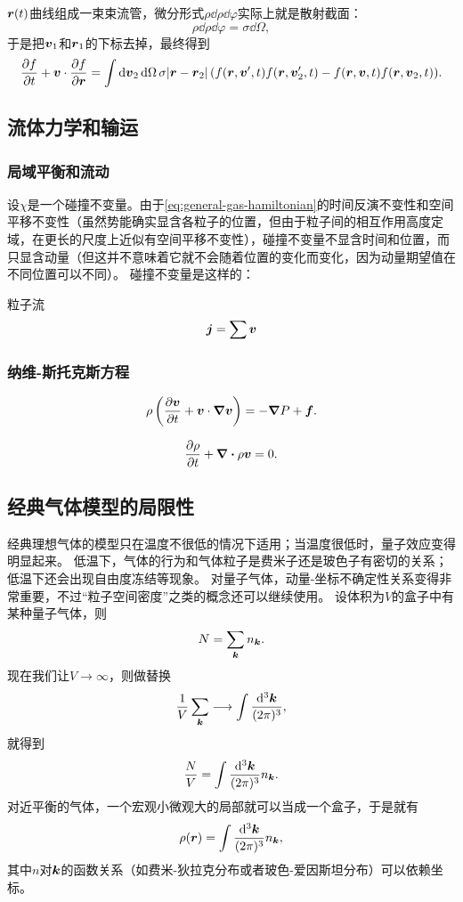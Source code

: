 \documentclass[hyperref, UTF8, a4paper]{ctexart}
\begin{document}
$\vb*{r}(t)$曲线组成一束束流管，微分形式$\rho \dd{\rho} \dd{\varphi}$实际上就是散射截面：
\[
    \rho \dd{\rho} \dd{\varphi} = \sigma \dd{\Omega},
\]
于是把$\vb*{v}_1$和$\vb*{r}_1$的下标去掉，最终得到
\begin{equation}
    \pdv{f}{t} + \vb*{v} \cdot \pdv{f}{\vb*{r}} = \int \dd{\vb*{v}_2} \dd{\Omega} \sigma \abs*{\vb*{r}-\vb*{r}_2} (f(\vb*{r}, \vb*{v}', t) f(\vb*{r}, \vb*{v}'_{2}, t) - f(\vb*{r}, \vb*{v}, t) f(\vb*{r}, \vb*{v}_{2}, t)).
\end{equation}

\subsection{流体力学和输运}

\subsubsection{局域平衡和流动}

设$\chi$是一个碰撞不变量。由于\eqref{eq:general-gas-hamiltonian}的时间反演不变性和空间平移不变性（虽然势能确实显含各粒子的位置，但由于粒子间的相互作用高度定域，在更长的尺度上近似有空间平移不变性），碰撞不变量不显含时间和位置，而只显含动量（但这并不意味着它就不会随着位置的变化而变化，因为动量期望值在不同位置可以不同）。
碰撞不变量是这样的：

粒子流
\[
    \vb*{j} = \sum \vb*{v}
\]

\subsubsection{纳维-斯托克斯方程}

\begin{equation}
    \rho \left( \pdv{\vb*{v}}{t} + \vb*{v} \cdot \grad{\vb*{v}} \right) = - \grad{P} + \vb*{f}.
\end{equation}

\begin{equation}
    \pdv{\rho}{t} + \div{\rho \vb*{v}} = 0.
    \label{eq:transportation-eq}
\end{equation}

\subsection{经典气体模型的局限性}

经典理想气体的模型只在温度不很低的情况下适用；当温度很低时，量子效应变得明显起来。
低温下，气体的行为和气体粒子是费米子还是玻色子有密切的关系；低温下还会出现自由度冻结等现象。
对量子气体，动量-坐标不确定性关系变得非常重要，不过“粒子空间密度”之类的概念还可以继续使用。
设体积为$V$的盒子中有某种量子气体，则
\[
    N = \sum_{\vb*{k}} n_{\vb*{k}}.
\]
现在我们让$V\to \infty$，则做替换
\[
    \frac{1}{V} \sum_{\vb*{k}} \longrightarrow \int \frac{\dd[3]{\vb*{k}}}{(2\pi)^3},
\]
就得到
\[
    \frac{N}{V} = \int \frac{\dd[3]{\vb*{k}}}{(2\pi)^3} n_{\vb*{k}}.
\]
对近平衡的气体，一个宏观小微观大的局部就可以当成一个盒子，于是就有
\begin{equation}
    \rho(\vb*{r}) = \int \frac{\dd[3]{\vb*{k}}}{(2\pi)^3} n_{\vb*{k}},
\end{equation}
其中$n$对$\vb*{k}$的函数关系（如费米-狄拉克分布或者玻色-爱因斯坦分布）可以依赖坐标。
\end{document}

